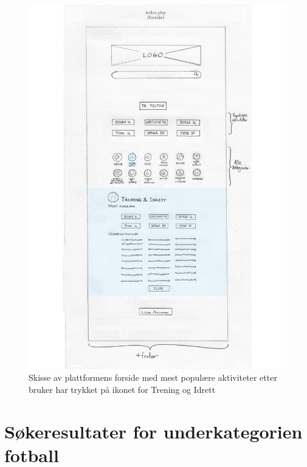 \begin{figure}[H]
\centering
\includegraphics[width=.9\textwidth]{Illustrasjoner/Skisser-pdf/1.0/1-4-forside-utbrettsmeny-mest-populaere.pdf}
\caption{Skisse av plattformens forside med mest populære aktiviteter etter bruker har trykket på ikonet for Trening og Idrett}
\label{vedlegg:1-4-forside-utbrett-mest-pop}
\end{figure}

\section{Søkeresultater for underkategorien fotball}

